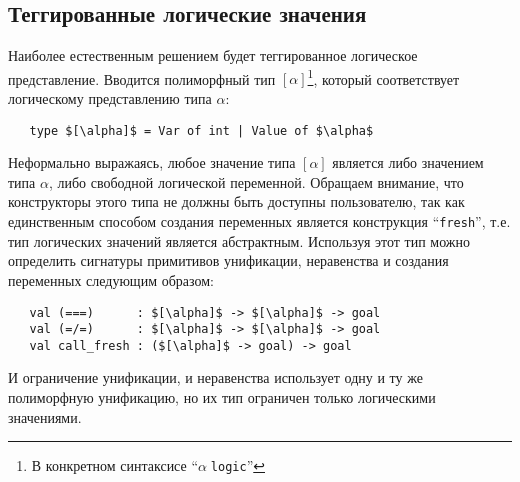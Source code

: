 \subsection{Теггированные логические значения}

Наиболее естественным решением будет теггированное логическое представление.
Вводится полиморфный тип $[\alpha]$\footnote{В конкретном синтаксисе ``$\alpha\;$\lstinline|logic|''}, который соответствует логическому представлению типа $\alpha$:


\begin{lstlisting}
   type $[\alpha]$ = Var of int | Value of $\alpha$
\end{lstlisting}

Неформально выражаясь, любое значение типа $[\alpha]$ является либо значением типа $\alpha$, либо свободной логической переменной.
Обращаем внимание, что конструкторы этого типа не должны быть доступны пользователю, так как единственным способом создания переменных является конструкция \enquote{\lstinline=fresh=}, т.е. тип логических значений является абстрактным.
Используя этот тип можно определить сигнатуры примитивов унификации, неравенства и создания переменных следующим образом:


\begin{lstlisting}
   val (===)      : $[\alpha]$ -> $[\alpha]$ -> goal
   val (=/=)      : $[\alpha]$ -> $[\alpha]$ -> goal
   val call_fresh : ($[\alpha]$ -> goal) -> goal
\end{lstlisting}

\noindent И ограничение унификации, и неравенства использует одну и ту же полиморфную унификацию, но их тип ограничен только логическими значениями.

